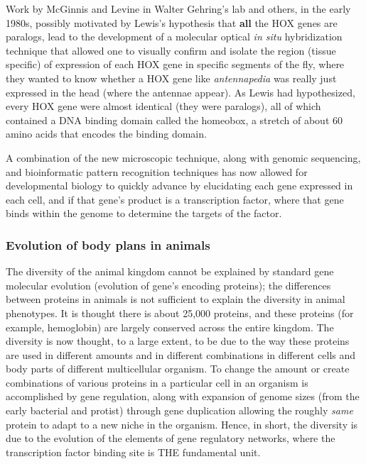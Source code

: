   Work by McGinnis and Levine in Walter Gehring's lab and others, in the early 1980s, possibly motivated by Lewis's hypothesis that \textbf{all} the HOX genes are paralogs, lead to the development of a molecular optical \textit{in situ} hybridization technique that allowed one to visually confirm and isolate the region (tissue specific) of expression of each HOX gene in specific segments of the fly, where they wanted to know whether a HOX gene like \textit{antennapedia} was really just expressed in the head (where the antennae appear).  As Lewis had hypothesized, every HOX gene were almost identical (they were paralogs), all of which contained a DNA binding domain called the homeobox, a stretch of about 60 amino acids that encodes the binding domain\cite{pmid6323992}.

A combination of the new microscopic technique, along with genomic sequencing, and bioinformatic pattern recognition techniques has now allowed for developmental biology to quickly advance by elucidating each gene expressed in each cell, and if that gene's product is a transcription factor, where that gene binds within the genome to determine the targets of the factor.

 

\subsubsection{Evolution of body plans in animals}

The diversity of the animal kingdom cannot be explained by standard gene molecular evolution (evolution of gene's encoding proteins); the differences between proteins in animals is not sufficient to explain the diversity in animal phenotypes\cite{pmid1090005}.  It is thought there is about 25,000 proteins, and these proteins (for example, hemoglobin) are largely conserved across the entire kingdom.  The diversity is now thought, to a large extent, to be due to the way these proteins are used in different amounts and in different combinations in different cells and body parts of different multicellular organism.  To change the amount or create combinations of various proteins in a particular cell in an organism is accomplished by gene regulation, along with expansion of genome sizes (from the early bacterial and protist) through gene duplication allowing the roughly \textit{same} protein to adapt to a new niche in the organism.  Hence, in short, the diversity is due to the evolution of the elements of gene regulatory networks, where the transcription factor binding site is THE fundamental unit.

